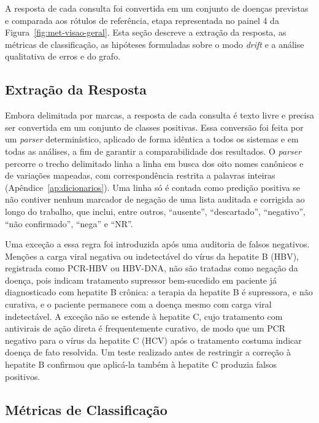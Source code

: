 A resposta de cada consulta foi convertida em um conjunto de doenças previstas e comparada aos rótulos de referência, etapa representada no painel 4 da Figura~\ref{fig:met-visao-geral}. Esta seção descreve a extração da resposta, as métricas de classificação, as hipóteses formuladas sobre o modo \textit{drift} e a análise qualitativa de erros e do grafo.

\subsection{Extração da Resposta}\label{sec:met-parser}

Embora delimitada por marcas, a resposta de cada consulta é texto livre e precisa ser convertida em um conjunto de classes positivas. Essa conversão foi feita por um \textit{parser} determinístico, aplicado de forma idêntica a todos os sistemas e em todas as análises, a fim de garantir a comparabilidade dos resultados. O \textit{parser} percorre o trecho delimitado linha a linha em busca dos oito nomes canônicos e de variações mapeadas, com correspondência restrita a palavras inteiras (Apêndice~\ref{ap:dicionarios}). Uma linha só é contada como predição positiva se não contiver nenhum marcador de negação de uma lista auditada e corrigida ao longo do trabalho, que inclui, entre outros, ``ausente'', ``descartado'', ``negativo'', ``não confirmado'', ``nega'' e ``NR''.

Uma exceção a essa regra foi introduzida após uma auditoria de falsos negativos. Menções a carga viral negativa ou indetectável do vírus da hepatite B (HBV), registrada como PCR-HBV ou HBV-DNA, não são tratadas como negação da doença, pois indicam tratamento supressor bem-sucedido em paciente já diagnosticado com hepatite B crônica: a terapia da hepatite B é supressora, e não curativa, e o paciente permanece com a doença mesmo com carga viral indetectável. A exceção não se estende à hepatite C, cujo tratamento com antivirais de ação direta é frequentemente curativo, de modo que um PCR negativo para o vírus da hepatite C (HCV) após o tratamento costuma indicar doença de fato resolvida. Um teste realizado antes de restringir a correção à hepatite B confirmou que aplicá-la também à hepatite C produzia falsos positivos.

\subsection{Métricas de Classificação}\label{sec:met-metricas}

